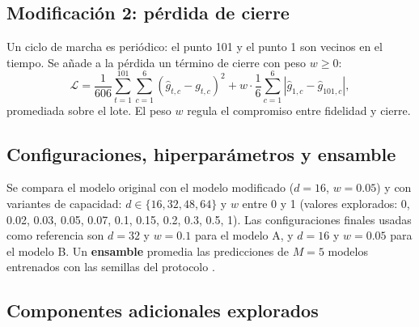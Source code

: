 \documentclass[11pt,a4paper]{article}
\begin{document}
\subsection{Modificación 2: pérdida de cierre}

Un ciclo de marcha es periódico: el punto 101 y el punto 1 son vecinos en el tiempo. Se añade a la pérdida un término de cierre con peso $w\ge 0$:
\begin{equation}
\mathcal L=\frac{1}{606}\sum_{t=1}^{101}\sum_{c=1}^{6}(\hat g_{t,c}-g_{t,c})^2+w\cdot\frac16\sum_{c=1}^{6}\left|\hat g_{1,c}-\hat g_{101,c}\right| ,
\end{equation}
promediada sobre el lote. El peso $w$ regula el compromiso entre fidelidad y cierre.

\subsection{Configuraciones, hiperparámetros y ensamble}

Se compara el modelo original con el modelo modificado ($d=16$, $w=0.05$) y con variantes de capacidad: $d\in\{16,32,48,64\}$ y $w$ entre 0 y 1 (valores explorados: 0, 0.02, 0.03, 0.05, 0.07, 0.1, 0.15, 0.2, 0.3, 0.5, 1). Las configuraciones finales usadas como referencia son $d=32$ y $w=0.1$ para el modelo A, y $d=16$ y $w=0.05$ para el modelo B. Un \textbf{ensamble} promedia las predicciones de $M=5$ modelos entrenados con las semillas del protocolo \cite{dietterich2000}.

\subsection{Componentes adicionales explorados}
\end{document}
